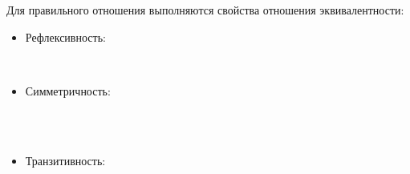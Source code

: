 Для правильного отношения выполняются свойства отношения
эквивалентности:

\begin{itemize}
\item Рефлексивность:

\begin{code}%
\> \AgdaSymbol{:}  \AgdaSymbol{\{} \AgdaSymbol{:} \AgdaSymbol{\}} \AgdaSymbol{(} \AgdaSymbol{:}  \AgdaSymbol{)}    \<%
\\
\>  \AgdaSymbol{=}     \AgdaInductiveConstructor{,} \AgdaSymbol{)} \AgdaInductiveConstructor{,}     \AgdaInductiveConstructor{,} \AgdaSymbol{)}\<%
\end{code}

\item Симметричность:

\begin{code}%
\> \AgdaSymbol{:}  \AgdaSymbol{\{} \AgdaSymbol{\}} \AgdaSymbol{\{} \AgdaSymbol{:}  \AgdaSymbol{\}} \AgdaSymbol{\{} \AgdaSymbol{:}  \AgdaSymbol{\}}\<%
\\
\>[0]\<[2]%
\>[2] \AgdaSymbol{(}  \AgdaSymbol{)}  \AgdaSymbol{(}  \AgdaSymbol{)}\<%
\\
\> \AgdaSymbol{(} \AgdaInductiveConstructor{,} \AgdaSymbol{)} \AgdaSymbol{=} \AgdaSymbol{(} \AgdaInductiveConstructor{,} \AgdaSymbol{)}\<%
\end{code}

\item Транзитивность:


\end{itemize}
